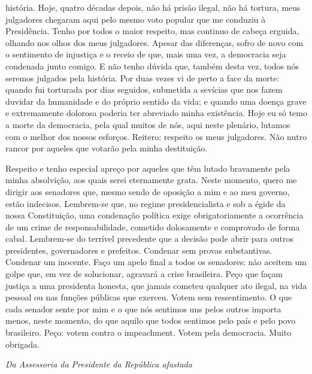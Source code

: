 história. Hoje, quatro décadas depois, não há prisão ilegal, não há
tortura, meus julgadores chegaram aqui pelo mesmo voto popular que me
conduziu à Presidência. Tenho por todos o maior respeito, mas continuo
de cabeça erguida, olhando nos olhos dos meus julgadores. Apesar das
diferenças, sofro de novo com o sentimento de injustiça e o receio de
que, mais uma vez, a democracia seja condenada junto comigo. E não tenho
dúvida que, também desta vez, todos nós seremos julgados pela história.
Por duas vezes vi de perto a face da morte: quando fui torturada por
dias seguidos, submetida a sevícias que nos fazem duvidar da humanidade
e do próprio sentido da vida; e quando uma doença grave e extremamente
dolorosa poderia ter abreviado minha existência. Hoje eu só temo a morte
da democracia, pela qual muitos de nós, aqui neste plenário, lutamos com
o melhor dos nossos esforços. Reitero: respeito os meus julgadores. Não
nutro rancor por aqueles que votarão pela minha destituição.

Respeito e tenho especial apreço por aqueles que têm lutado bravamente
pela minha absolvição, aos quais serei eternamente grata. Neste momento,
quero me dirigir aos senadores que, mesmo sendo de oposição a mim e ao
meu governo, estão indecisos. Lembrem-se que, no regime presidencialista
e sob a égide da nossa Constituição, uma condenação política exige
obrigatoriamente a ocorrência de um crime de responsabilidade, cometido
dolosamente e comprovado de forma cabal. Lembrem-se do terrível
precedente que a decisão pode abrir para outros presidentes,
governadores e prefeitos. Condenar sem provas substantivas. Condenar um
inocente. Faço um apelo final a todos os senadores: não aceitem um golpe
que, em vez de solucionar, agravará a crise brasileira. Peço que façam
justiça a uma presidenta honesta, que jamais cometeu qualquer ato
ilegal, na vida pessoal ou nas funções públicas que exerceu. Votem sem
ressentimento. O que cada senador sente por mim e o que nós sentimos uns
pelos outros importa menos, neste momento, do que aquilo que todos
sentimos pelo país e pelo povo brasileiro. Peço: votem contra o
impeachment. Votem pela democracia. Muito obrigada.

\emph{Da Assessoria da Presidente da República afastada}
